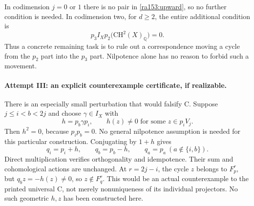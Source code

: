 \documentclass[11pt]{article}
\newcommand{\Q}{\mathbb{Q}}
\begin{document}
In codimension $j=0$ or $1$ there is no pair in
\eqref{ra153:upward}, so no further condition is needed.  In codimension two,
for $d\geq2$, the entire additional condition is
\begin{equation}\label{ra153:codim-two}
 p_3 I_X p_2\bigl(\mathrm{CH}^2(X)_{\Q}\bigr)=0.
\end{equation}
Thus a concrete remaining task is to rule out a correspondence moving a cycle
from the $p_2$ part into the $p_3$ part.  Nilpotence alone has no reason to
forbid such a movement.

\paragraph{Attempt III: an explicit counterexample certificate, if realizable.}
There is an especially small perturbation that would falsify C.  Suppose
$j\leq i<b<2j$ and choose $\gamma\in I_X$ with
\[
 h=p_b\gamma p_i,
 \qquad h(z)\ne0\text{ for some }z\in p_iV_j.
\]
Then $h^2=0$, because $p_i p_b=0$.  No general nilpotence assumption is
needed for this particular construction.  Conjugating by $1+h$ gives
\begin{equation}\label{ra153:elementary-perturbation}
 q_i=p_i+h,\qquad q_b=p_b-h,\qquad q_a=p_a\ (a\notin\{i,b\}).
\end{equation}
Direct multiplication verifies orthogonality and idempotence.  Their sum and
cohomological actions are unchanged.  At $r=2j-i$, the cycle $z$ belongs to
$F_p^r$, but $q_bz=-h(z)\ne0$, so $z\notin F_q^r$.  This would be an actual
counterexample to the printed universal C, not merely nonuniqueness of its
individual projectors.  No such geometric $h,z$ has been constructed here.
\end{document}
